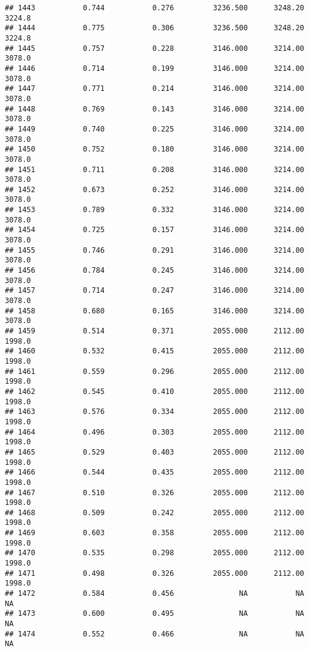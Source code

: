 \documentclass[
]{article}
\begin{document}
\begin{verbatim}
## 1443           0.744           0.276         3236.500      3248.20       3224.8
## 1444           0.775           0.306         3236.500      3248.20       3224.8
## 1445           0.757           0.228         3146.000      3214.00       3078.0
## 1446           0.714           0.199         3146.000      3214.00       3078.0
## 1447           0.771           0.214         3146.000      3214.00       3078.0
## 1448           0.769           0.143         3146.000      3214.00       3078.0
## 1449           0.740           0.225         3146.000      3214.00       3078.0
## 1450           0.752           0.180         3146.000      3214.00       3078.0
## 1451           0.711           0.208         3146.000      3214.00       3078.0
## 1452           0.673           0.252         3146.000      3214.00       3078.0
## 1453           0.789           0.332         3146.000      3214.00       3078.0
## 1454           0.725           0.157         3146.000      3214.00       3078.0
## 1455           0.746           0.291         3146.000      3214.00       3078.0
## 1456           0.784           0.245         3146.000      3214.00       3078.0
## 1457           0.714           0.247         3146.000      3214.00       3078.0
## 1458           0.680           0.165         3146.000      3214.00       3078.0
## 1459           0.514           0.371         2055.000      2112.00       1998.0
## 1460           0.532           0.415         2055.000      2112.00       1998.0
## 1461           0.559           0.296         2055.000      2112.00       1998.0
## 1462           0.545           0.410         2055.000      2112.00       1998.0
## 1463           0.576           0.334         2055.000      2112.00       1998.0
## 1464           0.496           0.303         2055.000      2112.00       1998.0
## 1465           0.529           0.403         2055.000      2112.00       1998.0
## 1466           0.544           0.435         2055.000      2112.00       1998.0
## 1467           0.510           0.326         2055.000      2112.00       1998.0
## 1468           0.509           0.242         2055.000      2112.00       1998.0
## 1469           0.603           0.358         2055.000      2112.00       1998.0
## 1470           0.535           0.298         2055.000      2112.00       1998.0
## 1471           0.498           0.326         2055.000      2112.00       1998.0
## 1472           0.584           0.456               NA           NA           NA
## 1473           0.600           0.495               NA           NA           NA
## 1474           0.552           0.466               NA           NA           NA

\end{verbatim}
\end{document}

